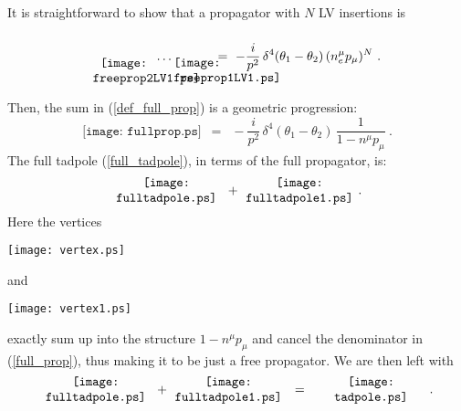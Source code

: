 \documentclass[12pt]{revtex4}
\begin{document}
It is straightforward to show that a propagator with $ N $
LV insertions is
\begin{equation}
\label{N_LV_prop}
\begin{minipage}[c]{1.7cm}
\vspace{0.8cm}
\centering
\texttt{[image: freeprop2LV1.ps]}
\end{minipage}
\ldots
\begin{minipage}[c]{1.0cm}
\vspace{0.78cm}
\centering
\texttt{[image: freeprop1LV1.ps]} 
\end{minipage}
~=~ 
- \frac{i}{p^2}\, \delta^4(\theta_1 - \theta_2)\,
    (n_e^\mu p_\mu)^N  
~.
\end{equation}

Then, the sum in (\ref{def_full_prop}) is a 
geometric progression: 
\begin{equation}
\label{full_prop}
\texttt{[image: fullprop.ps]}
 \;~=~\;
- \frac{i}{p^2}\,
\delta^4 (\theta_1 - \theta_2)\,
\frac{1}
           {1 - n^\mu p_\mu}
~.
\end{equation}
The full tadpole (\ref{full_tadpole}), in terms of the 
full propagator, is:
\[
\begin{minipage}[c]{3.0cm}
\centering
\texttt{[image: fulltadpole.ps]} 
\end{minipage}
~+~
\begin{minipage}[c]{3.0cm}
\centering
\texttt{[image: fulltadpole1.ps]} 
\end{minipage}
~.
\]
Here the vertices
\begin{minipage}[b]{1.5cm}
\centering
\texttt{[image: vertex.ps]} 
\vspace{-0.1cm}
\end{minipage}
and
\begin{minipage}[b]{1.5cm}
\centering
\texttt{[image: vertex1.ps]} 
\vspace{-0.1cm}
\end{minipage}
exactly sum up into the structure 
$ 1 - n^\mu p_\mu $
and cancel the denominator in (\ref{full_prop}),
thus making it to be just a free propagator.
We are then left with
\begin{equation}
\label{cancellation}
\begin{minipage}[c]{3.0cm}
\centering
\texttt{[image: fulltadpole.ps]} 
\end{minipage}
~+~
\begin{minipage}[c]{3.0cm}
\centering
\texttt{[image: fulltadpole1.ps]} 
\end{minipage}
~~=~~
\begin{minipage}[c]{3.0cm}
\centering
\texttt{[image: tadpole.ps]} 
\end{minipage}
~.
\end{equation}
\end{document}
